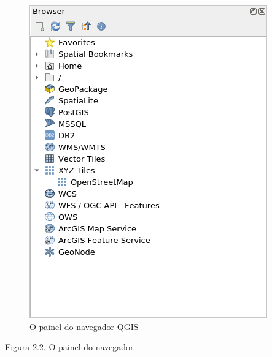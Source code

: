 \documentclass[
]{book}
\begin{document}
\begin{figure}
\centering
\includegraphics{media/modulo2/qgis-browser-1.png}
\caption{O painel do navegador QGIS}
\end{figure}

Figura 2.2. O painel do navegador
\end{document}

